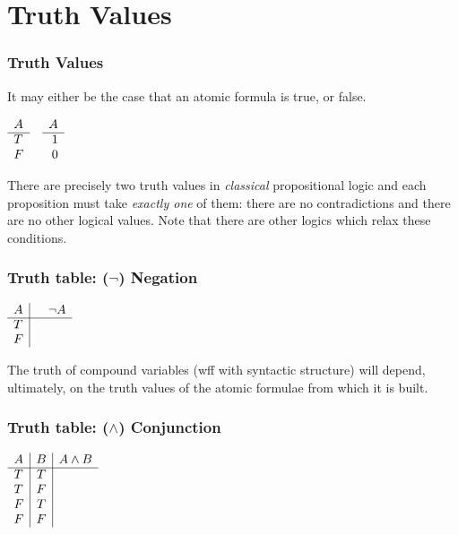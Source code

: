\documentclass{beamer}
\theoremstyle{indentDefn} \newtheorem{defn}[]{Definition}
\begin{document}
\section{Truth Values}

\begin{frame}
	\frametitle{Truth Values}
	
	It may either be the case that an atomic formula is true, or false.
	\begin{center}
		$\begin{array}{ l c r }			
			A & & A\\
			\cline{1 - 1} \cline{3 - 3}
			T & & 1\\ 
			F & & 0
		\end{array}$
	\end{center}	
	
	There are precisely two truth values in \emph{classical} propositional logic and each proposition must take \emph{exactly one} of them: there are no contradictions and there are no other logical values. Note that there are other logics which relax these conditions.

	
\end{frame}

\begin{frame}
	\frametitle{Truth table: ($\lnot$) Negation}
	
		\begin{center}
			$\begin{array}{ l | c r }			
				A & & \lnot A\\
				\cline{1 - 3}
				T & & \\ 
				F & & 
			\end{array}$
	\end{center}

The truth of compound variables (wff with syntactic structure) will depend, ultimately, on the truth values of the atomic formulae from which it is built.
	
\end{frame}

\begin{frame}
	\frametitle{Truth table: ($\land$) Conjunction}
	
	\begin{center}
		$\begin{array}{ l | c | r }			
		A & B & A \land B\\
		\cline{1 - 3}
		T & T & \\ 
		T & F & \\
		F & T & \\
		F & F & 	
		\end{array}$
	\end{center}

\end{frame}
\end{document}
